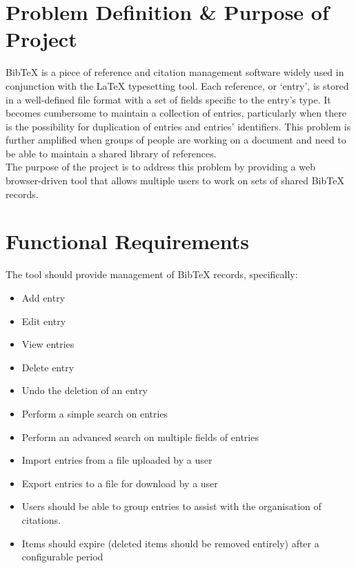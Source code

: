 \documentclass{l3proj}
\begin{document}
\section*{Problem Definition \& Purpose of Project}
BibTeX is a piece of reference and citation management software widely used in conjunction with the LaTeX typesetting tool.  Each reference, or `entry', is stored in a well-defined file format with a set of fields specific to the entry's type. It becomes cumbersome to maintain a collection of entries, particularly when there is the possibility for duplication of entries and entries' identifiers.  This problem is further amplified when groups of people are working on a document and need to be able to maintain a shared library of references.\\
The purpose of the project is to address this problem by providing a web browser-driven tool that allows multiple users to work on sets of shared BibTeX records.

\section*{Functional Requirements}
The tool should provide management of BibTeX records, specifically:
\begin{itemize}
\item Add entry
\item Edit entry
\item View entries
\item Delete entry
\item Undo the deletion of an entry
\item Perform a simple search on entries
\item Perform an advanced search on multiple fields of entries
\item Import entries from a file uploaded by a user
\item Export entries to a file for download by a user
\item Users should be able to group entries to assist with the organisation of citations.
\item Items should expire (deleted items should be removed entirely) after a configurable period
\end{itemize}
\end{document}
